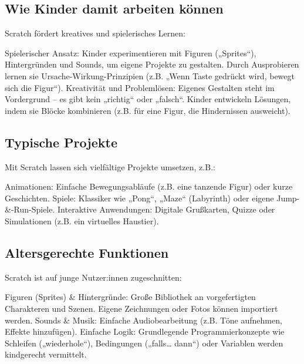 \subsection{Wie Kinder damit arbeiten können}
\label{sec:Wie Kinder damit arbeiten können}

Scratch fördert kreatives und spielerisches Lernen:

Spielerischer Ansatz:
Kinder experimentieren mit Figuren („Sprites“), Hintergründen und Sounds, um eigene Projekte zu gestalten.
Durch Ausprobieren lernen sie Ursache-Wirkung-Prinzipien (z.B. „Wenn Taste gedrückt wird, bewegt sich die Figur“).
Kreativität und Problemlösen:
Eigenes Gestalten steht im Vordergrund – es gibt kein „richtig“ oder „falsch“.
Kinder entwickeln Lösungen, indem sie Blöcke kombinieren (z.B. für eine Figur, die Hindernissen ausweicht).
\subsection{Typische Projekte}
\label{sec:Typische Projekte}
Mit Scratch lassen sich vielfältige Projekte umsetzen, z.B.:

Animationen:
Einfache Bewegungsabläufe (z.B. eine tanzende Figur) oder kurze Geschichten.
Spiele:
Klassiker wie „Pong“, „Maze“ (Labyrinth) oder eigene Jump-&-Run-Spiele.
Interaktive Anwendungen:
Digitale Grußkarten, Quizze oder Simulationen (z.B. ein virtuelles Haustier).

\subsection{Altersgerechte Funktionen}
\label{sec:Altersgerechte Funktionen}
Scratch ist auf junge Nutzer:innen zugeschnitten:

Figuren (Sprites) & Hintergründe:
Große Bibliothek an vorgefertigten Charakteren und Szenen.
Eigene Zeichnungen oder Fotos können importiert werden.
Sounds & Musik:
Einfache Audiobearbeitung (z.B. Töne aufnehmen, Effekte hinzufügen).
Einfache Logik:
Grundlegende Programmierkonzepte wie Schleifen („wiederhole“), Bedingungen („falls… dann“) oder Variablen werden kindgerecht vermittelt.


